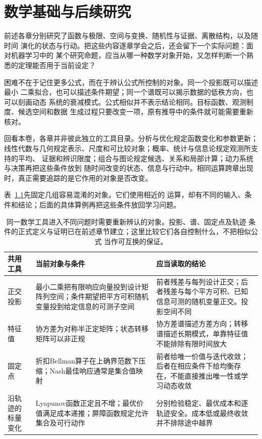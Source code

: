 \chapter{数学基础与后续研究}
\label{chap:mathematics-and-future-research}

前述各章分别研究了函数与极限、空间与变换、随机性与证据、离散结构，以及随时间
演化的状态与行动。把这些内容逐章学会之后，还会留下一个实际问题：面对机器学习中的
某个研究命题，应当从哪一种数学对象开始，又怎样判断一个熟悉的定理能否用于当前设定？

困难不在于记住更多公式，而在于辨认公式所控制的对象。同一个投影既可以描述最小
二乘拟合，也可以描述条件期望；同一个谱既可以揭示数据的低秩方向，也可以刻画动态
系统的衰减模式。公式相似并不表示结论相同。目标函数、观测制度、候选空间和数据
生成过程只要改变一项，原有推导中的条件就可能需要重新核对。

回看本卷，各章并非彼此独立的工具目录。分析与优化规定函数变化和参数更新；
线性代数与几何规定表示、尺度和可比较对象；概率、统计与信息论规定观测所支持的平均、
证据和辨识限度；组合与图论规定候选、关系和局部计算；动力系统与决策再把这些条件放到
随时间改变的状态、信息与行动中。相同运算跨章出现时，真正需要追踪的是它作用的对象是否改变。

表~\ref{tab:future-reused-mathematical-objects}先固定几组容易混淆的对象。它们使用相近的
运算，却有不同的输入、条件和结论；后面的具体算例再把这些条件放回学习问题。

\begin{table}[htbp]
  \centering
  \begin{tabularx}{\linewidth}{lXX}
    \toprule
    共用工具 & 当前对象与条件 & 应当读取的结论\\
    \midrule
    正交投影 & 最小二乘把有限响应向量投到设计矩阵列空间；条件期望把平方可积随机变量投到给定信息的可测子空间 & 前者残差与每列设计正交；后者残差与每个平方可积、已知信息可测的随机变量正交。投影空间不同\\
    特征值 & 协方差为对称半正定矩阵；状态转移矩阵可以非正规 & 协方差谱描述方差方向；转移谱描述长期模式，单靠特征值不能排除有限时间放大\\
    固定点 & 折扣Bellman算子在上确界范数下压缩；Nash最佳响应通常是集合值映射 & 前者给唯一价值与迭代收敛；后者在相应条件下给均衡存在，不能直接推出唯一性或学习动态收敛\\
    沿轨迹的标量变化 & Lyapunov函数正定且不增；最优价值满足成本递推；屏障函数规定允许集合及可行动作 & 分别检验稳定、最优成本和逐轨迹安全。成本低或最终收敛并不排除途中越界\\
    \bottomrule
  \end{tabularx}
  \caption{同一数学工具进入不同问题时需要重新辨认的对象。投影、谱、固定点及轨迹
  条件的正式定义与证明已在前述章节建立；这里比较它们各自控制什么，不把相似公式
  当作可互换的保证。}
  \label{tab:future-reused-mathematical-objects}
\end{table}

